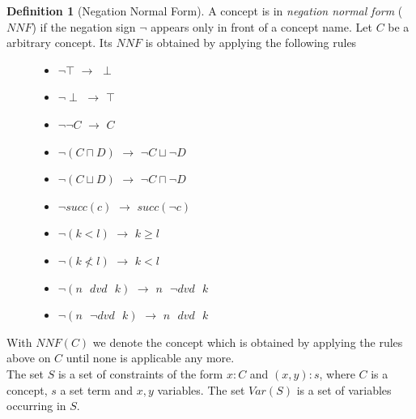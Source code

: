 \documentclass[a4paper,11pt]{scrartcl}
\theoremstyle{break}
\theoremstyle{definition}
\newtheorem{mydef}{Definition}
\begin{document}
\begin{mydef}[Negation Normal Form]
A concept is in \textit{negation normal form} ($NNF$) if the negation sign $\neg$ appears only in front of a concept name. Let $C$ be a arbitrary concept. Its $NNF$ is obtained by applying the following rules
\begin{figure}
\begin{minipage}[t]{.5\textwidth}
\raggedright
\begin{itemize}
\item $\neg\top$ $\rightarrow$ $\perp$
\item $\neg\perp$ $\rightarrow$ $\top$
\item $\neg\neg C$ $\rightarrow$ $C$
\item $\neg(C\sqcap D)$ $\rightarrow$ $\neg C \sqcup \neg D$
\item $\neg(C\sqcup D)$ $\rightarrow$ $\neg C \sqcap \neg D$
\item $\neg succ(c)$ $\rightarrow$ $succ(\neg c)$
\end{itemize}
\end{minipage}%
\begin{minipage}[t]{.5\textwidth}
\raggedleft
\begin{itemize}
\item $\neg (k<l)$ $\rightarrow$ $k\geq l$
\item $\neg (k\not<l)$ $\rightarrow$ $k<l$
\item $\neg (n\text{ } dvd \text{ } k)$ $\rightarrow$ $n\text{ } \neg dvd \text{ } k$
\item $\neg (n\text{ } \neg dvd \text{ } k)$ $\rightarrow$ $n\text{ } dvd \text{ } k$
\end{itemize}
\end{minipage}
\end{figure}
\end{mydef}
With $NNF(C)$ we denote the concept which is obtained by applying the rules above on $C$ until none is applicable any more.\\
The set $S$ is a set of constraints of the form $x:C$ and $(x,y):s$, where $C$ is a concept, $s$ a set term and $x,y$ variables. The set $Var(S)$ is a set of variables occurring in $S$.
\end{document}
